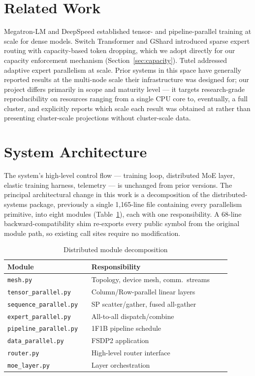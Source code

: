 \documentclass[conference]{IEEEtran}
\begin{document}
\section{Related Work}

Megatron-LM \cite{shoeybi2019megatron} and DeepSpeed \cite{rasley2020deepspeed}
established tensor- and pipeline-parallel training at scale for dense
models. Switch Transformer \cite{fedus2021switch} and GShard
\cite{lepikhin2020gshard} introduced sparse expert routing with capacity-based
token dropping, which we adopt directly for our capacity enforcement
mechanism (Section~\ref{sec:capacity}). Tutel \cite{hwang2023tutel}
addressed adaptive expert parallelism at scale. Prior systems in this space
have generally reported results at the multi-node scale their
infrastructure was designed for; our project differs primarily in scope
and maturity level --- it targets research-grade reproducibility on
resources ranging from a single CPU core to, eventually, a full cluster,
and explicitly reports which scale each result was obtained at rather than
presenting cluster-scale projections without cluster-scale data.

\section{System Architecture}
\label{sec:arch}

The system's high-level control flow --- training loop, distributed MoE
layer, elastic training harness, telemetry --- is unchanged from prior
versions. The principal architectural change in this work is a
decomposition of the distributed-systems package, previously a single
1{,}165-line file containing every parallelism primitive, into eight
modules (Table~\ref{tab:modules}), each with one responsibility. A
68-line backward-compatibility shim re-exports every public symbol from
the original module path, so existing call sites require no modification.

\begin{table}[t]
\centering
\caption{Distributed module decomposition}
\label{tab:modules}
\begin{tabular}{@{}p{0.32\linewidth}p{0.58\linewidth}@{}}
\toprule
\textbf{Module} & \textbf{Responsibility} \\
\midrule
\texttt{mesh.py} & Topology, device mesh, comm.\ streams \\
\texttt{tensor\_parallel.py} & Column/Row-parallel linear layers \\
\texttt{sequence\_parallel.py} & SP scatter/gather, fused all-gather \\
\texttt{expert\_parallel.py} & All-to-all dispatch/combine \\
\texttt{pipeline\_parallel.py} & 1F1B pipeline schedule \\
\texttt{data\_parallel.py} & FSDP2 application \\
\texttt{router.py} & High-level router interface \\
\texttt{moe\_layer.py} & Layer orchestration \\
\bottomrule
\end{tabular}
\end{table}
\end{document}
